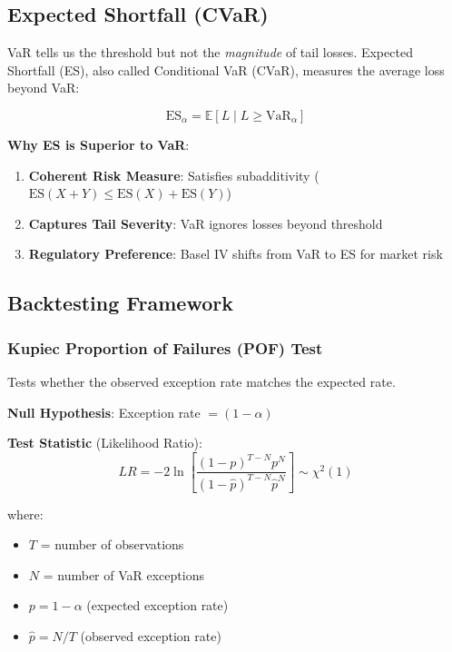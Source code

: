 \documentclass[12pt,a4paper]{article}
\begin{document}
\subsection{Expected Shortfall (CVaR)}

VaR tells us the threshold but not the \textit{magnitude} of tail losses. Expected Shortfall (ES), also called Conditional VaR (CVaR), measures the average loss beyond VaR:

\begin{equation}
\text{ES}_\alpha = \mathbb{E}[L \mid L \geq \text{VaR}_\alpha]
\end{equation}

\textbf{Why ES is Superior to VaR}:
\begin{enumerate}
    \item \textbf{Coherent Risk Measure}: Satisfies subadditivity ($\text{ES}(X+Y) \leq \text{ES}(X) + \text{ES}(Y)$)
    \item \textbf{Captures Tail Severity}: VaR ignores losses beyond threshold
    \item \textbf{Regulatory Preference}: Basel IV shifts from VaR to ES for market risk
\end{enumerate}

\subsection{Backtesting Framework}

\subsubsection{Kupiec Proportion of Failures (POF) Test}

Tests whether the observed exception rate matches the expected rate.

\textbf{Null Hypothesis}: Exception rate $= (1-\alpha)$

\textbf{Test Statistic} (Likelihood Ratio):
\begin{equation}
LR = -2 \ln \left[ \frac{(1-p)^{T-N} p^N}{(1-\hat{p})^{T-N} \hat{p}^N} \right] \sim \chi^2(1)
\end{equation}

where:
\begin{itemize}
    \item $T$ = number of observations
    \item $N$ = number of VaR exceptions
    \item $p = 1-\alpha$ (expected exception rate)
    \item $\hat{p} = N/T$ (observed exception rate)
\end{itemize}
\end{document}
